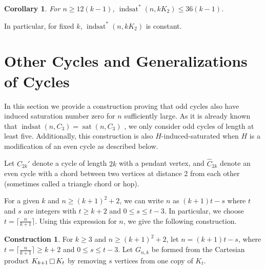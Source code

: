 \documentclass[12pt]{amsart}
\theoremstyle{plain}
\newtheorem{cor}{Corollary}[thm]
\theoremstyle{definition}
\newtheorem{cons}[thm]{Construction}
\theoremstyle{remark}
\newcommand{\indsat}[2]{\ensuremath{\operatorname{indsat}(#1,#2)}\xspace}
\newcommand{\sis}[2]{\ensuremath{{\operatorname{indsat}}^*(#1,#2)}\xspace}
\newcommand{\sat}[2]{\ensuremath{\operatorname{sat}(#1,#2)}\xspace}
\newcommand{\cl}[1]{\lceil#1\rceil}
\newcommand{\cartprod}{\mathop{\scriptsize\Box}}
\begin{document}

\begin{cor} For $n\geq 12(k-1)$, $\sis{n}{kK_2} \leq 36(k-1)$.
\end{cor}
In particular, for fixed $k$, $\sis{n}{kK_2}$ is constant.


%
%


\section{Other Cycles and Generalizations of Cycles}

In this section we provide a construction proving that odd cycles also have induced saturation number zero for $n$ sufficiently large.  As it is already known that  $\indsat{n}{C_3} = \sat{n}{C_3}$ \cite{MS}, we only consider odd cycles of length at least five.  Additionally,  this construction is also $H$-induced-saturated when $H$ is a modification of an even cycle as described below.

Let $C_{2k}'$ denote a cycle of length $2k$ with a pendant vertex, and $\hat C_{2k}$ denote an even cycle with a chord between two vertices at distance 2 from each other (sometimes called a triangle chord or hop).

For a given $k$ and $n \geq (k+1)^2+2$, we can write $n$ as $(k+1)t-s$ where $t$ and $s$ are integers with $t \geq k+2$ and $0 \leq s \leq t-3$.
In particular, we choose $t=\cl{\frac{n}{k+1}}$.
Using this expression for $n$, we give the following construction.

\begin{cons}\label{cons:cycles}
For $k \geq 3$ and $n \geq (k+1)^2+2$, let $n=(k+1)t-s$, where $t=\cl{\frac{n}{k+1}} \ge k+2$ and $0 \leq s \le t-3$.
Let $G_{n,k}$ be formed from the Cartesian product $K_{k+1} \cartprod K_t$ by removing $s$ vertices from one copy of $K_t$.
\end{cons}
\end{document}
